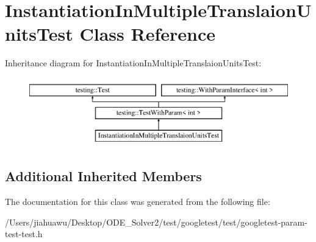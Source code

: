 \hypertarget{class_instantiation_in_multiple_translaion_units_test}{}\section{Instantiation\+In\+Multiple\+Translaion\+Units\+Test Class Reference}
\label{class_instantiation_in_multiple_translaion_units_test}
Inheritance diagram for Instantiation\+In\+Multiple\+Translaion\+Units\+Test\+:\begin{figure}[H]
\begin{center}
\leavevmode
\includegraphics[height=3.000000cm]{class_instantiation_in_multiple_translaion_units_test}
\end{center}
\end{figure}
\subsection*{Additional Inherited Members}


The documentation for this class was generated from the following file\+:\begin{DoxyCompactItemize}
\item 
/\+Users/jiahuawu/\+Desktop/\+O\+D\+E\+\_\+\+Solver2/test/googletest/test/googletest-\/param-\/test-\/test.\+h\end{DoxyCompactItemize}

